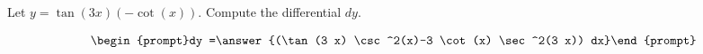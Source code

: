 \documentclass{ximera}
\author{Bart Snapp}
\begin{document}
\begin{exercise}

Let $y= \tan (3 x) (-\cot (x))$. Compute the differential $dy$.

\[
\begin{prompt}dy =\answer{(\tan (3 x) \csc ^2(x)-3 \cot (x) \sec ^2(3 x)) dx}\end{prompt}
\]
\end{exercise}
\end{document}

